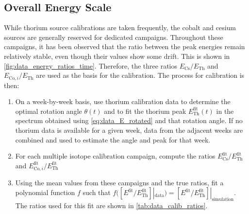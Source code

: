 \documentclass[herrin-thesis.tex]{subfiles}
\begin{document}
\subsection{Overall Energy Scale}
While thorium source calibrations are taken frequently, the cobalt and cesium sources are generally reserved for dedicated campaigns. Throughout these campaigns, it has been observed that the ratio between the peak energies remain relatively stable, even though their values show some drift. This is shown in \cref{fig:data_energy_ratios_time}. Therefore, the three ratios \(E_\text{Cs}/E_\text{Th}\) and \(E_{\text{Co},i}/E_\text{Th}\) are used as the basis for the calibration. The process for calibration is then:
\begin{enumerate}
\item On a week-by-week basis, use thorium calibration data to determine the optimal rotation angle \(\theta(t)\) and to fit the thorium peak \(E^\text{fit}_\text{Th}(t)\) in the spectrum obtained using \cref{eq:data_E_rotated} and that rotation angle. If no thorium data is available for a given week, data from the adjacent weeks are combined and used to estimate the angle and peak for that week.
\item For each multiple isotope calibration campaign, compute the ratios \(E^\text{fit}_\text{Cs}/E^\text{fit}_\text{Th}\) and \(E^\text{fit}_{\text{Co},i}/E^\text{fit}_\text{Th}\)
\item Using the mean values from these campaigns and the true ratios, fit a polynomial function \(f\) such that \(f([E^\text{fit}/E^\text{fit}_\text{Th}]|_\text{data}) = [E^\text{fit}/E^\text{fit}_\text{Th}]|_\text{simulation}\). The ratios used for this fit are shown in \cref{tab:data_calib_ratios}.
\end{enumerate}
\end{document}
